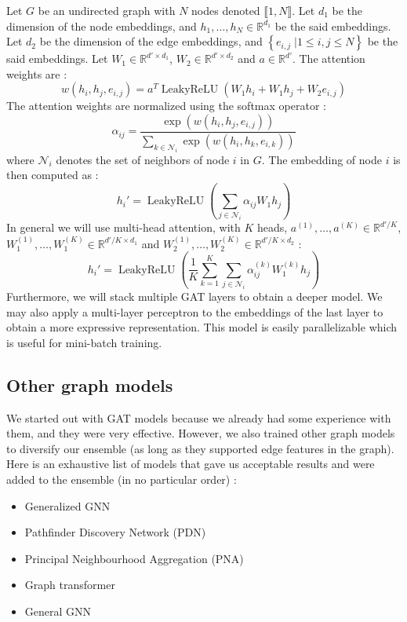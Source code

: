 \documentclass[switch, 11pt]{article}
\DeclareMathOperator{\leakyrelu}{LeakyReLU}
\newcommand{\R}{\mathbb{R}}
\begin{document}
\begin{multicols}{2}
    Let $G$ be an undirected graph with $N$ nodes denoted $\llbracket1, N\rrbracket$. Let $d_1$ be the dimension of the node embeddings, and $h_1,\dots,h_N\in\R^{d_1}$ be the said embeddings. Let $d_2$ be the dimension of the edge embeddings, and $\left\{e_{i,j} \; | 1\leq i,j\leq N\right\}$ be the said embeddings. Let $W_1\in\R^{d'\times d_1}$, $W_2\in\R^{d'\times d_2}$ and $a\in\R^{d'}$. The attention weights are :
    \begin{equation}
        w(h_i,h_j, e_{i,j}) = a^T \leakyrelu(W_1h_i + W_1h_j + W_2e_{i,j})
    \end{equation}
    The attention weights are normalized using the softmax operator :
    \begin{equation}
        \alpha_{ij} = \frac{\exp(w(h_i,h_j, e_{i,j}))}{\sum_{k\in\mathcal{N}_i}\exp(w(h_i,h_k, e_{i,k}))}
    \end{equation}
    where $\mathcal{N}_i$ denotes the set of neighbors of node $i$ in $G$. The embedding of node $i$ is then computed as :
    \begin{equation}
        h_i' = \leakyrelu\left(\sum_{j\in\mathcal{N}_i}\alpha_{ij}W_1h_j\right)
    \end{equation}
    In general we will use multi-head attention, with $K$ heads, $a^{(1)},\dots,a^{(K)}\in\R^{d'/K}$, $W_1^{(1)},\dots,W_1^{(K)}\in\R^{d'/K\times d_1}$ and $W_2^{(1)},\dots,W_2^{(K)}\in\R^{d'/K\times d_2}$ :
    \begin{equation}
        h_i' = \leakyrelu\left(\frac{1}{K}\sum_{k=1}^K\sum_{j\in\mathcal{N}_i}\alpha_{ij}^{(k)}W_1^{(k)}h_j\right)
    \end{equation}
    Furthermore, we will stack multiple GAT layers to obtain a deeper model. We may also apply a multi-layer perceptron to the embeddings of the last layer to obtain a more expressive representation. This model is easily parallelizable which is useful for mini-batch training.

    \subsection{Other graph models}

    We started out with GAT models because we already had some experience with them, and they were very effective. However, we also trained other graph models to diversify our ensemble (as long as they supported edge features in the graph). Here is an exhaustive list of models that gave us acceptable results and were added to the ensemble (in no particular order) :
    \begin{itemize}
        \item Generalized GNN \cite{li-2020}
        \item Pathfinder Discovery Network (PDN) \cite{rozemberczki-2021}
        \item Principal Neighbourhood Aggregation (PNA) \cite{corso-2020}
        \item Graph transformer \cite{shi-2020}
        \item General GNN \cite{you-2020}
    \end{itemize}


\end{multicols}
\end{document}
